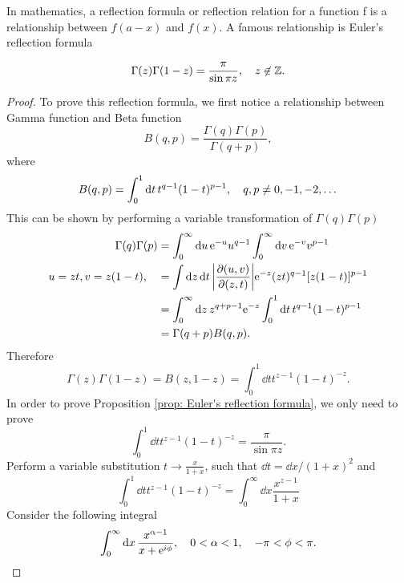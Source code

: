 \documentclass[10pt]{article}
\begin{document}
	In mathematics, a reflection formula or reflection relation for a function f is a relationship between $f(a-x)$ and $f(x)$. A famous relationship is Euler's reflection formula
	\begin{proposition}\label{prop: Euler's reflection formula}
		\begin{equation}
			\Gamma(z)\Gamma(1-z) = \frac{\pi}{\sin{\pi z}}\qc z \not \in \mathbb{Z}.
		\end{equation}
	\end{proposition}
	\begin{proof}
		To prove this reflection formula, we first notice a relationship between Gamma function and Beta function
		\begin{equation}
			B(q, p) = \frac{\Gamma(q) \Gamma(p)}{\Gamma(q + p)},
		\end{equation}
		where
		\begin{equation}
			B(q, p) = \int_0^1 \dd{t} t^{q-1} (1-t)^{p-1} \qc q,p \neq 0, -1, -2, \dots
		\end{equation}
		This can be shown by performing a variable transformation of $\Gamma(q) \Gamma(p)$
		\begin{align*}
			\Gamma(q) \Gamma(p) &= \int_0^{\infty} \dd{u} \e^{-u} u^{q-1} \int_0^{\infty} \dd{v} \e^{-v} v^{p-1} \\
			u = zt, v = z(1-t)\qc &= \int \dd{z} \dd{t} \abs{\pdv{(u,v)}{(z,t)}} \e^{-z} (zt)^{q-1} [z(1-t)]^{p-1} \\
			&= \int_0^{\infty} \dd{z} z^{q+p-1} \e^{-z} \int_0^1 \dd{t} t^{q-1} (1-t)^{p-1} \\
			&= \Gamma(q+p) B(q, p).
		\end{align*}
		Therefore
		\begin{equation}
			\Gamma(z)\Gamma(1-z) = B(z, 1-z) = \int_0^1 \dd{t} t^{z-1} (1-t)^{-z}.
		\end{equation}
		In order to prove Proposition \ref{prop: Euler's reflection formula}, we only need to prove
		\begin{equation}
			\int_0^1 \dd{t} t^{z-1} (1-t)^{-z} = \frac{\pi}{\sin{\pi z}}.
		\end{equation}
		Perform a variable substitution $t \to \frac{x}{1+x}$, such that $\dd{t} = \dd{x}/(1+x)^2$ and
		\begin{equation}
			\int_0^1 \dd{t} t^{z-1} (1-t)^{-z} = \int_0^{\infty} \dd{x} \frac{x^{z-1}}{1+x}
		\end{equation}
		Consider the following integral
		\begin{equation}
			\int_0^{\infty} \dd{x} \frac{x^{\alpha-1}}{x+\e^{i \phi}}\qc 0<\alpha<1\qc -\pi<\phi<\pi.
		\end{equation}
	\end{proof}
\end{document}
